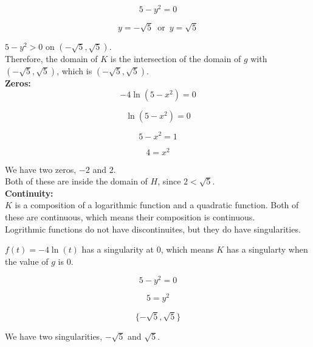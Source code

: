 \documentclass{ximera}
\begin{document}
\[
5 - y^2 = 0
\]

\[
y = -\sqrt{5}  \,  \text{ or } \, y = \sqrt{5} 
\]




$5 - y^2 > 0$ on $(-\sqrt{5}, \sqrt{5})$. \\




Therefore, the domain of $K$ is the intersection of the domain of $g$ with $(-\sqrt{5}, \sqrt{5})$, which is $(-\sqrt{5}, \sqrt{5})$. \\



\textbf{\textcolor{blue!55!black}{Zeros:}} \\




\[
-4 \ln(5 - x^2) = 0
\]


\[
 \ln(5 - x^2) = 0
\]


\[
5 - x^2 = 1
\]


\[
4 = x^2
\]


We have two zeros, $-2$ and $2$. \\

Both of these are inside the domain of $H$, since $2 < \sqrt{5}$. \\













\textbf{\textcolor{blue!55!black}{Continuity:}} \\


$K$ is a composition of a logarithmic function and a quadratic function.  Both of these are continuous, which means their composition is continuous. \\

Logrithmic functions do not have discontinuites, but they do have singularities.  


$f(t) = -4\ln(t)$ has a singularity at $0$, which means $K$ has a singularty when the value of $g$ is $0$.



\[
5 - y^2 = 0
\]



\[
5 = y^2
\]



\[
\{ -\sqrt{5}, \sqrt{5} \}
\]

We have two singularities, $-\sqrt{5}$ and $\sqrt{5}$. \\
\end{document}
